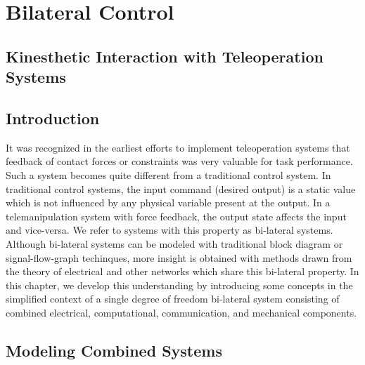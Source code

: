 

%
%
%
%     


\chapter{Bilateral Control}

%
%
%
%



\section*{Kinesthetic Interaction with Teleoperation Systems}

\section{Introduction}
   It was recognized in the earliest efforts to implement teleoperation systems that feedback of contact forces or constraints was very valuable for task performance.  Such a system becomes quite different from a traditional control system.   In traditional control systems, the input command (desired output) is a static value which is not influenced by any physical variable present at the output.  In a telemanipulation system with force feedback, the output state affects the input and vice-versa.   We refer to systems with this property as bi-lateral systems.   Although bi-lateral systems can be modeled with traditional block diagram or signal-flow-graph techinques, more insight is obtained with methods drawn from the theory of electrical and other networks which share this bi-lateral property.
%
In this chapter, we develop this understanding by introducing some concepts in the simplified context of a single degree of freedom bi-lateral system consisting of combined electrical, computational, communication, and mechanical components.
%
%
\section{Modeling Combined Systems}

